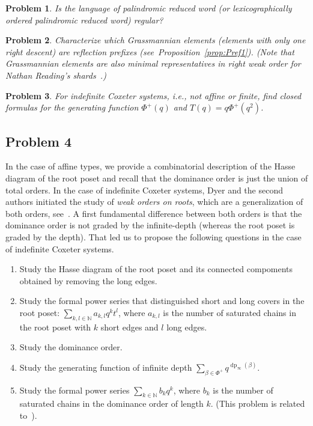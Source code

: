 \documentclass{amsart}
\newtheorem{Problem}{Problem}
\theoremstyle{definition}
\newcommand{\dep}{\operatorname{dp}}
\begin{document}

\begin{Problem}
    Is the language of palindromic reduced word (or lexicographically ordered palindromic reduced word) regular?
\end{Problem}

\begin{Problem}
    Characterize which Grassmannian elements (elements with only one right descent)  are reflection prefixes  (see~Proposition~\ref{prop:Pref1}). (Note that Grassmannian elements are also minimal representatives in right weak order for Nathan Reading's shards~\cite{Re11-1}.)
\end{Problem}


\begin{Problem} For indefinite Coxeter systems, i.e., not affine or finite, find closed formulas for the generating function $\Phi^+(q)$ and $T(q)=q\Phi^+(q^2)$.
\end{Problem}


\subsection*{Problem 4} In the case of affine types, we provide a combinatorial description  of the Hasse diagram of the root poset and recall that the dominance order is just the union of total orders. In the case of indefinite Coxeter systems, Dyer and the second authors initiated the study of {\em weak orders on roots}, which are a generalization of both orders, see~\cite[\S5]{DH}. A first fundamental difference between both orders is that the dominance order is not graded by the infinite-depth (whereas the root poset is graded by the depth). That led us to propose the following questions in the case of indefinite Coxeter systems.
{\em \begin{enumerate}
    \item Study the Hasse diagram of the root poset and its connected compoments obtained by removing the long edges.
    \item Study the formal power series that distinguished short and long covers in the root poset: $\sum_{k,l\in\mathbb{N}} a_{k,l}q^kt^l$, where $a_{k,l}$ is the number of saturated chains in the root poset with $k$ short edges and $l$ long edges. 
    \item Study the dominance order. 
    \item Study the generating function of infinite depth $\sum_{\beta\in\Phi^+} q^{\dep_{\infty}(\beta)}$.
    \item Study the formal power series $\sum_{k\in\mathbb{N}} b_kq^k$, where $b_k$ is the number of saturated chains in the dominance order of length $k$. (This problem is related to~\cite[Question~5]{DFHM24}).
\end{enumerate}
}







\end{document}
